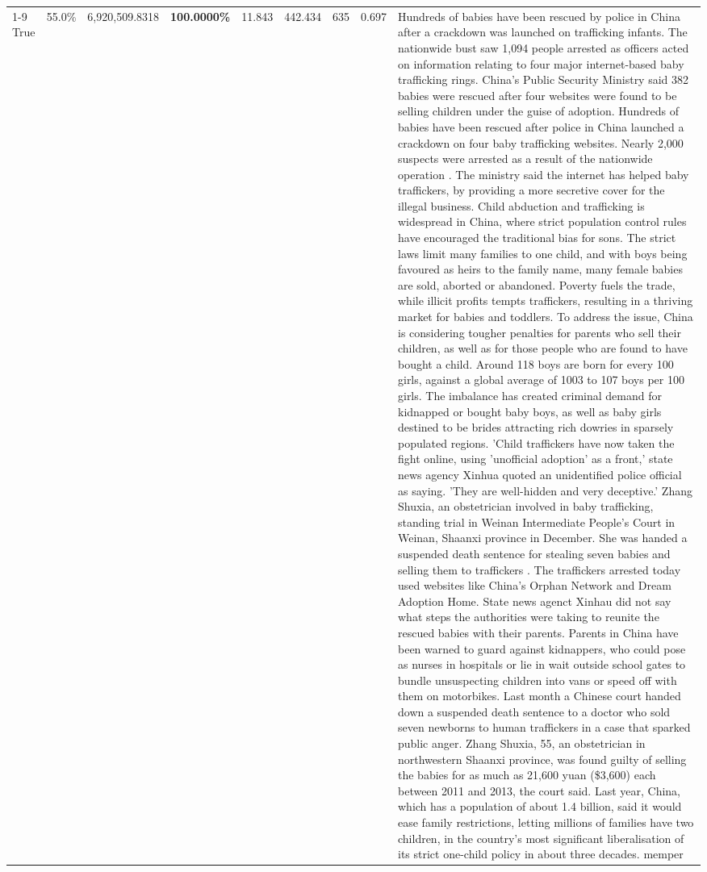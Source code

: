 \begin{table}[H]
\begin{tabular}{lllrlllll}
\cline{1-9}
True & 55.0\% & 6,920,509.8318 & \bfseries \color{red} 100.0000\% & 11.843 & 442.434 & 635 & 0.697 & Hundreds of babies have been rescued by police in China after a crackdown was launched on trafficking infants. The nationwide bust saw 1,094 people arrested as officers acted on information relating to four major internet-based baby trafficking rings. China's Public Security Ministry said 382 babies were rescued after four websites were found to be selling children under the guise of adoption. Hundreds of babies have been rescued after police in China launched a crackdown on four baby trafficking websites. Nearly 2,000 suspects were arrested as a result of the nationwide operation . The ministry said the internet has helped baby traffickers, by providing a more secretive cover for the illegal business. Child abduction and trafficking is widespread in China, where strict population control rules have encouraged the traditional bias for sons. The strict laws limit many families to one child, and with boys being favoured as heirs to the family name, many female babies are sold, aborted or abandoned. Poverty fuels the trade, while illicit profits tempts traffickers, resulting in a thriving market for babies and toddlers. To address the issue, China is considering tougher penalties for parents who sell their children, as well as for those people who are found to have bought a child. Around 118 boys are born for every 100 girls, against a global average of 1003 to 107 boys per 100 girls. The imbalance has created criminal demand for kidnapped or bought baby boys, as well as baby girls destined to be brides attracting rich dowries in sparsely populated regions. 'Child traffickers have now taken the fight online, using 'unofficial adoption' as a front,' state news agency Xinhua quoted an unidentified police official as saying. 'They are well-hidden and very deceptive.' Zhang Shuxia, an obstetrician involved in baby trafficking, standing trial in Weinan Intermediate People's Court in Weinan, Shaanxi province in December. She was handed a suspended death sentence for stealing seven babies and selling them to traffickers . The traffickers arrested today used websites like China's Orphan Network and Dream Adoption Home. State news agenct Xinhau did not say what steps the authorities were taking to reunite the rescued babies with their parents. Parents in China have been warned to guard against kidnappers, who could pose as nurses in hospitals or lie in wait outside school gates to bundle unsuspecting children into vans or speed off with them on motorbikes. Last month a Chinese court handed down a suspended death sentence to a doctor who sold seven newborns to human traffickers in a case that sparked public anger. Zhang Shuxia, 55, an obstetrician in northwestern Shaanxi province, was found guilty of selling the babies for as much as 21,600 yuan (\$3,600) each between 2011 and 2013, the court said. Last year, China, which has a population of about 1.4 billion, said it would ease family restrictions, letting millions of families have two children, in the country's most significant liberalisation of its strict one-child policy in about three decades. memper \\

\end{tabular}
\end{table}
